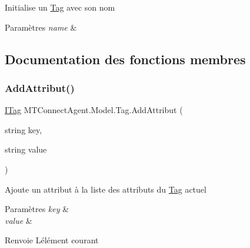 Initialise un \mbox{\hyperlink{class_m_t_connect_agent_1_1_model_1_1_tag}{Tag}} avec son nom 


\begin{DoxyParams}{Paramètres}
{\em name} & \\
\hline
\end{DoxyParams}


\subsection{Documentation des fonctions membres}
\mbox{\label{class_m_t_connect_agent_1_1_model_1_1_tag_ad39fa56fac8573b45c5d987288928e31}} 
\subsubsection{\texorpdfstring{Add\+Attribut()}{AddAttribut()}}
{\footnotesize\ttfamily \mbox{\hyperlink{interface_m_t_connect_agent_1_1_model_1_1_i_tag}{I\+Tag}} M\+T\+Connect\+Agent.\+Model.\+Tag.\+Add\+Attribut (\begin{DoxyParamCaption}\item[{string}]{key,  }\item[{string}]{value }\end{DoxyParamCaption})\hspace{0.3cm}{\ttfamily [inline]}}



Ajoute un attribut à la liste des attributs du \mbox{\hyperlink{class_m_t_connect_agent_1_1_model_1_1_tag}{Tag}} actuel 


\begin{DoxyParams}{Paramètres}
{\em key} & \\
\hline
{\em value} & \\
\hline
\end{DoxyParams}
\begin{DoxyReturn}{Renvoie}
L\textquotesingle{}élément courant
\end{DoxyReturn}
\mbox{\label{class_m_t_connect_agent_1_1_model_1_1_tag_a74c01a8e302f87b611980b583e58b8c3}} 
